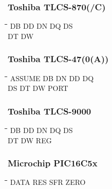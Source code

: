 \subsubsection{Toshiba TLCS-870(/C)}
{\tt\begin{tabbing}
\hspace{3cm}\=\hspace{3cm}\=\hspace{3cm}\=\hspace{3cm}\=\kill
DB         \> DD          \> DN         \> DQ          \> DS \\
DT         \> DW \\
\end{tabbing}}

\subsubsection{Toshiba TLCS-47(0(A))}
{\tt\begin{tabbing}
\hspace{3cm}\=\hspace{3cm}\=\hspace{3cm}\=\hspace{3cm}\=\kill
ASSUME     \> DB          \> DN         \> DD          \> DQ \\
DS         \> DT          \> DW         \> PORT \\
\end{tabbing}}

\subsubsection{Toshiba TLCS-9000}
{\tt\begin{tabbing}
\hspace{3cm}\=\hspace{3cm}\=\hspace{3cm}\=\hspace{3cm}\=\kill
DB         \> DD          \> DN         \> DQ          \> DS \\
DT         \> DW          \> REG \\
\end{tabbing}}

\subsubsection{Microchip PIC16C5x}
{\tt\begin{tabbing}
\hspace{3cm}\=\hspace{3cm}\=\hspace{3cm}\=\hspace{3cm}\=\kill
DATA       \> RES         \> SFR         \> ZERO \\
\end{tabbing}}


